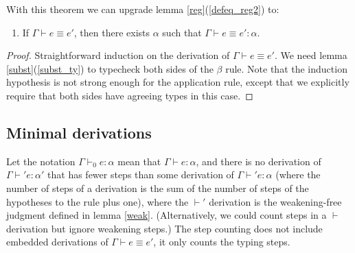 With this theorem we can upgrade lemma \ref{reg}(\ref{defeq_reg2}) to:
\begin{lemma}
\begin{enumerate}
\item If $\Gamma\vdash e\equiv e'$, then there exists $\alpha$ such that $\Gamma\vdash e\equiv e':\alpha$.
\end{enumerate}
\end{lemma}
\begin{proof}
Straightforward induction on the derivation of $\Gamma\vdash e\equiv e'$. We need lemma \ref{subst}(\ref{subst_ty}) to typecheck both sides of the $\beta$ rule. Note that the induction hypothesis is not strong enough for the application rule, except that we explicitly require that both sides have agreeing types in this case.
\end{proof}

\subsection{Minimal derivations}
Let the notation $\Gamma\vdash_0e:\alpha$ mean that $\Gamma\vdash e:\alpha$, and there is no derivation of  $\Gamma\vdash' e:\alpha'$ that has fewer steps than some derivation of $\Gamma\vdash' e:\alpha$ (where the number of steps of a derivation is the sum of the number of steps of the hypotheses to the rule plus one), where the $\vdash'$ derivation is the weakening-free judgment defined in lemma \ref{weak}. (Alternatively, we could count steps in a $\vdash$ derivation but ignore weakening steps.) The step counting does not include embedded derivations of $\Gamma\vdash e\equiv e'$, it only counts the typing steps.

